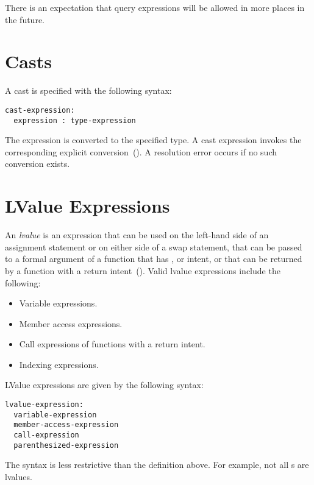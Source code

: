 There is an expectation that query expressions will be allowed in more
places in the future.

\section{Casts}
\label{Casts}

A cast is specified with the following syntax:
\begin{syntax}
\begin{verbatim}
cast-expression:
  expression : type-expression
\end{verbatim}
\end{syntax}
The expression is converted to the specified type.  A cast expression invokes
the corresponding explicit conversion~().  A
resolution error occurs if no such conversion exists.

\section{LValue Expressions}
\label{LValue_Expressions}

An {\em lvalue} is an expression that can be used on the left-hand
side of an assignment statement or on either side of a swap statement,
that can be passed to a formal argument of a function that
has ,  or  intent, or that can be returned by a
function with a  return intent~().  Valid
lvalue expressions include the following:
\begin{itemize}
\item
 Variable expressions.
\item
 Member access expressions.
\item
 Call expressions of functions with a  return intent.
\item
 Indexing expressions.
\end{itemize}

LValue expressions are given by the following syntax:
\begin{syntax}
\begin{verbatim}
lvalue-expression:
  variable-expression
  member-access-expression
  call-expression
  parenthesized-expression
\end{verbatim}
\end{syntax}
The syntax is less restrictive than the definition above.  For
example, not all s are lvalues.


